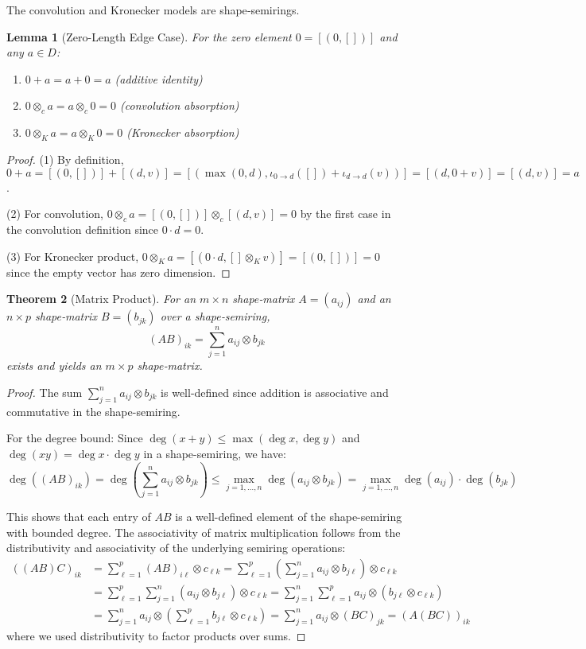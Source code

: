 \documentclass[11pt]{article}
\newtheorem{theorem}{Theorem}[section]
\newtheorem{lemma}[theorem]{Lemma}
\begin{document}
The convolution and Kronecker models are shape‑semirings.

\begin{lemma}[Zero-Length Edge Case]\label{lem:zeroLength}
For the zero element $0 = [(0,[])]$ and any $a \in D$:
\begin{enumerate}[leftmargin=2em]
\item $0 + a = a + 0 = a$ (additive identity)
\item $0 \otimes_c a = a \otimes_c 0 = 0$ (convolution absorption)  
\item $0 \otimes_K a = a \otimes_K 0 = 0$ (Kronecker absorption)
\end{enumerate}
\end{lemma}
\begin{proof}
(1) By definition, $0 + a = [(0,[])] + [(d,v)] = [(\max(0,d), \iota_{0 \to d}([]) + \iota_{d \to d}(v))] = [(d, 0 + v)] = [(d,v)] = a$.

(2) For convolution, $0 \otimes_c a = [(0,[])] \otimes_c [(d,v)] = 0$ by the first case in the convolution definition since $0 \cdot d = 0$.

(3) For Kronecker product, $0 \otimes_K a = [(0 \cdot d, [] \otimes_K v)] = [(0,[])] = 0$ since the empty vector has zero dimension.
\qedhere
\end{proof}

\begin{theorem}[Matrix Product]
For an $m\times n$ shape‑matrix $A=(a_{ij})$ and an $n\times p$ shape‑matrix $B=(b_{jk})$ over a shape‑semiring,
\[(AB)_{ik}=\sum_{j=1}^{n} a_{ij}\otimes b_{jk}\] exists and yields an $m\times p$ shape‑matrix.
\end{theorem}
\begin{proof}
The sum $\sum_{j=1}^{n} a_{ij}\otimes b_{jk}$ is well-defined since addition is associative and commutative in the shape-semiring. 

For the degree bound: Since $\deg(x+y) \leq \max(\deg x, \deg y)$ and $\deg(xy) = \deg x \cdot \deg y$ in a shape-semiring, we have:
\[\deg((AB)_{ik}) = \deg\left(\sum_{j=1}^{n} a_{ij}\otimes b_{jk}\right) \leq \max_{j=1,\ldots,n} \deg(a_{ij}\otimes b_{jk}) = \max_{j=1,\ldots,n} \deg(a_{ij}) \cdot \deg(b_{jk})\]

This shows that each entry of $AB$ is a well-defined element of the shape-semiring with bounded degree. The associativity of matrix multiplication follows from the distributivity and associativity of the underlying semiring operations:
\begin{align}
((AB)C)_{ik} &= \sum_{\ell=1}^{p} (AB)_{i\ell} \otimes c_{\ell k} = \sum_{\ell=1}^{p} \left(\sum_{j=1}^{n} a_{ij} \otimes b_{j\ell}\right) \otimes c_{\ell k} \\
&= \sum_{\ell=1}^{p} \sum_{j=1}^{n} (a_{ij} \otimes b_{j\ell}) \otimes c_{\ell k} = \sum_{j=1}^{n} \sum_{\ell=1}^{p} a_{ij} \otimes (b_{j\ell} \otimes c_{\ell k}) \\
&= \sum_{j=1}^{n} a_{ij} \otimes \left(\sum_{\ell=1}^{p} b_{j\ell} \otimes c_{\ell k}\right) = \sum_{j=1}^{n} a_{ij} \otimes (BC)_{jk} = (A(BC))_{ik}
\end{align}
where we used distributivity to factor products over sums.
\qedhere
\end{proof}
\end{document}
